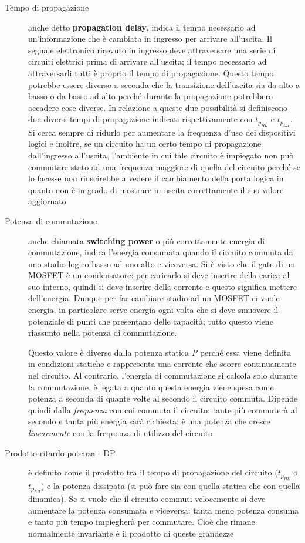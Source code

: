 \documentclass[12pt, a4paper]{report}
\begin{document}
\begin{description}
    \item[Tempo di propagazione] anche detto \textbf{propagation delay}, indica il tempo necessario ad un'informazione che è cambiata in ingresso per arrivare all'uscita. Il segnale elettronico ricevuto in ingresso deve attraversare una serie di circuiti elettrici prima di arrivare all'uscita; il tempo necessario ad attraversarli tutti è proprio il tempo di propagazione. Questo tempo potrebbe essere diverso a seconda che la transizione dell'uscita sia da alto a basso o da basso ad alto perché durante la propagazione potrebbero accadere cose diverse. In relazione a queste due possibilità si definiscono due diversi tempi di propagazione indicati rispettivamente con $t_{p_{HL}}$ e $t_{p_{LH}}$. Si cerca sempre di ridurlo per aumentare la frequenza d'uso dei dispositivi logici e inoltre, se un circuito ha un certo tempo di propagazione dall'ingresso all'uscita, l'ambiente in cui tale circuito è impiegato non può commutare stato ad una frequenza maggiore di quella del circuito perché se lo facesse non riuscirebbe a vedere il cambiamento della porta logica in quanto non è in grado di mostrare in uscita correttamente il suo valore aggiornato 
    \item[Potenza di commutazione] anche chiamata \textbf{switching power} o più correttamente energia di commutazione, indica l'energia consumata quando il circuito commuta da uno stadio logico basso ad uno alto e viceversa. Si è visto che il gate di un MOSFET è un condensatore: per caricarlo si deve inserire della carica al suo interno, quindi si deve inserire della corrente e questo significa mettere dell'energia. Dunque per far cambiare stadio ad un MOSFET ci vuole energia, in particolare serve energia ogni volta che si deve smuovere il potenziale di punti che presentano delle capacità; tutto questo viene riassunto nella potenza di commutazione.
    
    Questo valore è diverso dalla potenza statica \textit{P} perché essa viene definita in condizioni statiche e rappresenta una corrente che scorre continuamente nel circuito. Al contrario, l'energia di commutazione si calcola solo durante la commutazione, è legata a quanto questa energia viene spesa come potenza a seconda di quante volte al secondo il circuito commuta. Dipende quindi dalla \textit{frequenza} con cui commuta il circuito: tante più commuterà al secondo e tanta più energia sarà richiesta: è una potenza che cresce \textit{linearmente} con la frequenza di utilizzo del circuito
    \item[Prodotto ritardo-potenza - DP] è definito come il prodotto tra il tempo di propagazione del circuito ($t_{p_{HL}}$ o $t_{p_{LH}}$) e la potenza dissipata (si può fare sia con quella statica che con quella dinamica). Se si vuole che il circuito commuti velocemente si deve aumentare la potenza consumata e viceversa: tanta meno potenza consuma e tanto più tempo impiegherà per commutare. Cioè che rimane normalmente invariante è il prodotto di queste grandezze 
\end{description}
\end{document}
